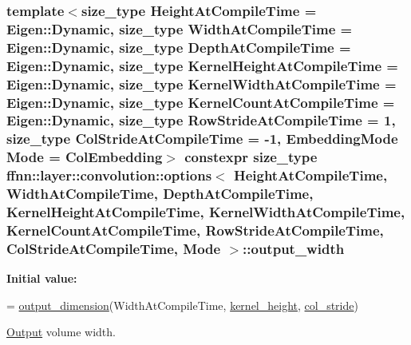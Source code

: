 \hypertarget{structffnn_1_1layer_1_1convolution_1_1options_a3d54e3e43cc0e955c4a64bcf6b5800d7}{
\subsubsection[{output\-\_\-width}]{\setlength{\rightskip}{0pt plus 5cm}template$<$size\-\_\-type Height\-At\-Compile\-Time = Eigen\-::\-Dynamic, size\-\_\-type Width\-At\-Compile\-Time = Eigen\-::\-Dynamic, size\-\_\-type Depth\-At\-Compile\-Time = Eigen\-::\-Dynamic, size\-\_\-type Kernel\-Height\-At\-Compile\-Time = Eigen\-::\-Dynamic, size\-\_\-type Kernel\-Width\-At\-Compile\-Time = Eigen\-::\-Dynamic, size\-\_\-type Kernel\-Count\-At\-Compile\-Time = Eigen\-::\-Dynamic, size\-\_\-type Row\-Stride\-At\-Compile\-Time = 1, size\-\_\-type Col\-Stride\-At\-Compile\-Time = -\/1, Embedding\-Mode Mode = Col\-Embedding$>$ constexpr {\bf size\-\_\-type} {\bf ffnn\-::layer\-::convolution\-::options}$<$ Height\-At\-Compile\-Time, Width\-At\-Compile\-Time, Depth\-At\-Compile\-Time, Kernel\-Height\-At\-Compile\-Time, Kernel\-Width\-At\-Compile\-Time, Kernel\-Count\-At\-Compile\-Time, Row\-Stride\-At\-Compile\-Time, Col\-Stride\-At\-Compile\-Time, Mode $>$\-::output\-\_\-width\hspace{0.3cm}{\ttfamily [static]}}}\label{structffnn_1_1layer_1_1convolution_1_1options_a3d54e3e43cc0e955c4a64bcf6b5800d7}
{\bfseries Initial value\-:}
\begin{DoxyCode}
=
    \hyperlink{namespaceffnn_1_1layer_1_1convolution_aca263840b789df041d868a8a87dbf36a}{output\_dimension}(WidthAtCompileTime,  \hyperlink{structffnn_1_1layer_1_1convolution_1_1options_a36fbdfa26d8032268955f68e66f09662}{kernel\_height}, 
      \hyperlink{structffnn_1_1layer_1_1convolution_1_1options_a9f5dc60cb9493d65119fa087c63c0c93}{col\_stride})
\end{DoxyCode}


\hyperlink{classffnn_1_1layer_1_1_output}{Output} volume width. 

